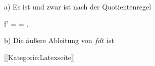 a) Es ist
 und zwar ist nach der Quotientenregel

\mavergleichskettealign
{\vergleichskettealign
{f'
}
{ =} { {  }
}
{ =} { {  }
}
{ } {
}
{ } {
}
}
{}
{}{.}

b) Die äußere Ableitung von $fdt$ ist

 [[Kategorie:Latexseite]]
